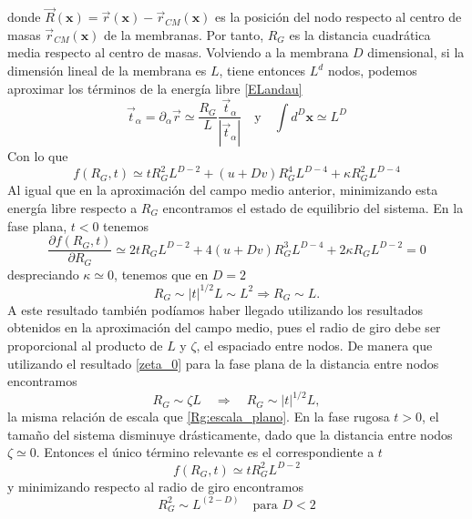donde $\vec{R}(\mathbf{x})=\vec{r}(\mathbf{x})-\vec{r}_{CM}(\mathbf{x})$ es la
posición del nodo respecto al centro de masas $\vec{r}_{CM}(\mathbf{x})$ de la
membranas. Por tanto, $R_G$ es la distancia cuadrática media respecto al
centro de masas. Volviendo a la membrana $D$ dimensional, si la dimensión
lineal de la membrana es $L$, tiene entonces $L^d$ nodos, podemos
aproximar los términos \cite{Gomper:triangulated} de la energía libre \eqref{ELandau}  
\begin{equation}
\vec{t}_{\alpha}=\partial_{\alpha} \vec{r}\simeq \frac{R_G}{L}
\frac{\vec{t}_{\alpha}}{|\vec{t}_{\alpha}|}\quad \text{y}\quad \int
d^D\mathbf{x}\simeq L^D
\end{equation}
Con lo que
\begin{equation}
f(R_G,t)\simeq t R_G^2 L^{D-2}+(u+Dv) R_G^4 L^{D-4}+\kappa R_G^2 L^{D-4}
\end{equation}
Al igual que en la aproximación del campo medio anterior, minimizando esta
energía libre respecto a $R_G$ encontramos el estado de equilibrio del sistema. En la fase
plana, $t<0$ tenemos
\begin{equation}
\frac{\partial f(R_G,t)}{\partial R_G}\simeq 2t R_G L^{D-2}+4(u+Dv) R_G^3
L^{D-4}+2 \kappa R_G L^{D-2}=0
\end{equation}
despreciando $\kappa\simeq 0$, tenemos que en $D=2$
\begin{equation}\label{Rg:escala_plano}
R_G\sim |t|^{1/2}L\sim L^2 \Rightarrow R_G\sim L.
\end{equation}
A este resultado también podíamos haber llegado utilizando los resultados
obtenidos en la aproximación del campo medio, pues el radio de giro debe ser
proporcional al producto de $L$ y $\zeta$, el espaciado entre
nodos. De manera que utilizando el resultado \eqref{zeta_0} para la fase plana
de la distancia entre nodos encontramos
\begin{equation}
R_G\sim \zeta L \quad \Rightarrow \quad R_G\sim |t|^{1/2}L,
\end{equation}
la misma relación de escala que \eqref{Rg:escala_plano}. En la fase rugosa
$t>0$, el tamaño del sistema disminuye drásticamente, dado que la distancia
entre nodos $\zeta\simeq 0$. Entonces el único término relevante es el correspondiente a $t$
\begin{equation}
f(R_G,t)\simeq t R_G^2 L^{D-2} 
\end{equation}
y minimizando respecto al radio de giro encontramos
\begin{equation}
R_G^2\sim L^{(2-D)} \quad \text{para } D<2
\end{equation}
